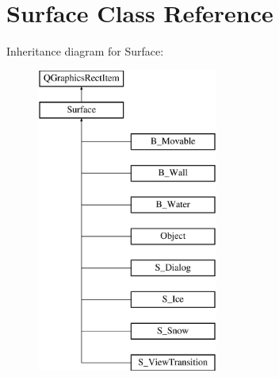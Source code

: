 \hypertarget{class_surface}{}\section{Surface Class Reference}
\label{class_surface}
Inheritance diagram for Surface\+:\begin{figure}[H]
\begin{center}
\leavevmode
\includegraphics[height=10.000000cm]{class_surface}
\end{center}
\end{figure}
